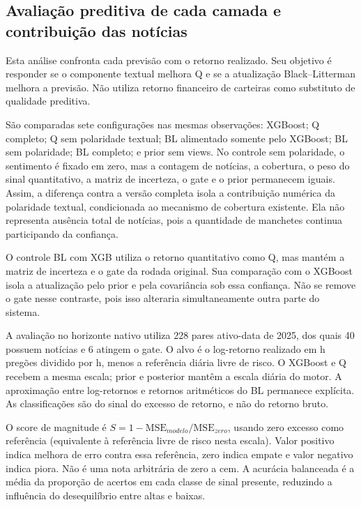 \subsection{Avaliação preditiva de cada camada e contribuição das notícias}

Esta análise confronta cada previsão com o retorno realizado. Seu objetivo é responder se o componente textual melhora Q e se a atualização Black--Litterman melhora a previsão. Não utiliza retorno financeiro de carteiras como substituto de qualidade preditiva.

São comparadas sete configurações nas mesmas observações: XGBoost; Q completo; Q sem polaridade textual; BL alimentado somente pelo XGBoost; BL sem polaridade; BL completo; e prior sem views. No controle sem polaridade, o sentimento é fixado em zero, mas a contagem de notícias, a cobertura, o peso do sinal quantitativo, a matriz de incerteza, o gate e o prior permanecem iguais. Assim, a diferença contra a versão completa isola a contribuição numérica da polaridade textual, condicionada ao mecanismo de cobertura existente. Ela não representa ausência total de notícias, pois a quantidade de manchetes continua participando da confiança.

O controle BL com XGB utiliza o retorno quantitativo como Q, mas mantém a matriz de incerteza e o gate da rodada original. Sua comparação com o XGBoost isola a atualização pelo prior e pela covariância sob essa confiança. Não se remove o gate nesse contraste, pois isso alteraria simultaneamente outra parte do sistema.

A avaliação no horizonte nativo utiliza 228 pares ativo-data de 2025, dos quais 40 possuem notícias e 6 atingem o gate. O alvo é o log-retorno realizado em h pregões dividido por h, menos a referência diária livre de risco. O XGBoost e Q recebem a mesma escala; prior e posterior mantêm a escala diária do motor. A aproximação entre log-retornos e retornos aritméticos do BL permanece explícita. As classificações são do sinal do excesso de retorno, e não do retorno bruto.

O score de magnitude é $S=1-\mathrm{MSE}_{modelo}/\mathrm{MSE}_{zero}$, usando zero excesso como referência (equivalente à referência livre de risco nesta escala). Valor positivo indica melhora de erro contra essa referência, zero indica empate e valor negativo indica piora. Não é uma nota arbitrária de zero a cem. A acurácia balanceada é a média da proporção de acertos em cada classe de sinal presente, reduzindo a influência do desequilíbrio entre altas e baixas.

